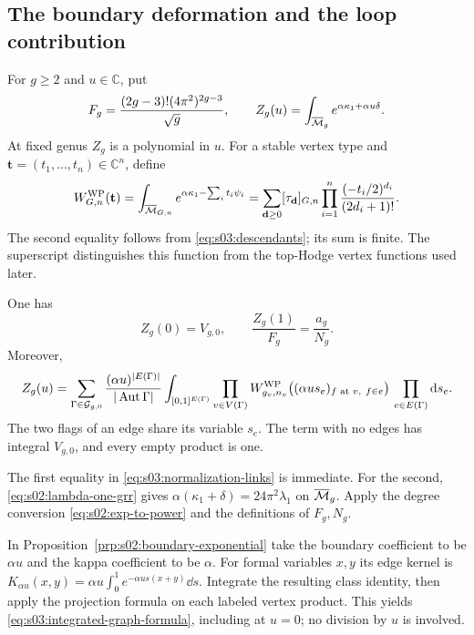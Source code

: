 \subsection{The boundary deformation and the loop contribution}
\label{subsec:s03:02}

For $g\geq2$ and $u\in\mathbb C$, put
\begin{equation}
\label{eq:s03:deformation}
F_g=\frac{(2g-3)!(4\pi^2)^{2g-3}}{\sqrt g},
\qquad
Z_g(u)=\int_{\overline{\mathcal{M}}_g}e^{\alpha\kappa_1+\alpha u\delta}.
\end{equation}
At fixed genus $Z_g$ is a polynomial in $u$. For a stable vertex type
and $\mathbf t=(t_1,\ldots,t_n)\in\mathbb C^n$, define
\begin{equation}
\label{eq:s03:vertex-function}
W^{\rm WP}_{G,n}(\mathbf t)
=\int_{\overline{\mathcal{M}}_{G,n}}e^{\alpha\kappa_1-\sum_i t_i\psi_i}
=\sum_{\mathbf d\geq0}[\tau_{\mathbf d}]_{G,n}
  \prod_{i=1}^n\frac{(-t_i/2)^{d_i}}{(2d_i+1)!}.
\end{equation}
The second equality follows from \eqref{eq:s03:descendants}; its sum
is finite. The superscript distinguishes this function from the
top-Hodge vertex functions used later.

\begin{lmm}
\label{lmm:s03:exact-deformation}
One has
\begin{equation}
\label{eq:s03:normalization-links}
Z_g(0)=V_{g,0},\qquad
\frac{Z_g(1)}{F_g}=\frac{a_g}{N_g}.
\end{equation}
Moreover,
\begin{equation}
\label{eq:s03:integrated-graph-formula}
Z_g(u)=\sum_{\Gamma\in\mathcal G_{g,0}}
 \frac{(\alpha u)^{|E(\Gamma)|}}{|\operatorname{Aut}\Gamma|}
 \int_{[0,1]^{E(\Gamma)}}
 \prod_{v\in V(\Gamma)}
 W^{\rm WP}_{g_v,n_v}
       \bigl((\alpha u s_e)_{f\text{ at }v,\ f\in e}\bigr)
 \,\prod_{e\in E(\Gamma)}\mathrm{d} s_e.
\end{equation}
The two flags of an edge share its variable $s_e$. The term with no
edges has integral $V_{g,0}$, and every empty product is one.
\end{lmm}
\begin{prf}
The first equality in \eqref{eq:s03:normalization-links} is immediate.
For the second, \eqref{eq:s02:lambda-one-grr} gives
$\alpha(\kappa_1+\delta)=24\pi^2\lambda_1$ on $\overline{\mathcal{M}}_g$.
Apply the degree conversion \eqref{eq:s02:exp-to-power} and the
definitions of $F_g,N_g$.

In Proposition~\ref{prp:s02:boundary-exponential} take the boundary
coefficient to be $\alpha u$ and the kappa coefficient to be $\alpha$.
For formal variables $x,y$ its edge kernel is
$K_{\alpha u}(x,y)=\alpha u\int_0^1e^{-\alpha u s(x+y)}\dd s$.
Integrate the resulting class identity, then apply the projection
formula on each labeled vertex product. This yields
\eqref{eq:s03:integrated-graph-formula}, including at $u=0$; no division
by $u$ is involved.
\end{prf}


